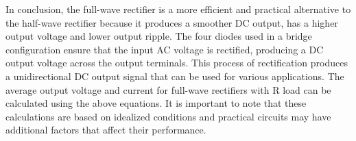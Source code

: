In conclusion, the full-wave rectifier is a more efficient and practical alternative to the half-wave rectifier because it produces a smoother DC output, has a higher output voltage and lower output ripple. The four diodes used in a bridge configuration ensure that the input AC voltage is rectified, producing a DC output voltage across the output terminals.
This process of rectification produces a unidirectional DC output signal that can be used for various applications.
The average output voltage and current for full-wave rectifiers with R load can be calculated using the above equations. It is important to note that these calculations are based on idealized conditions and practical circuits may have additional factors that affect their performance.
\pagebreak